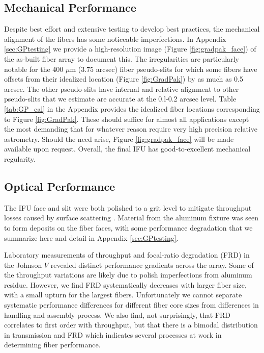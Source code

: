 \subsection{Mechanical Performance}

Despite best effort and extensive testing to develop best practices,
the mechanical alignment of the \GP fibers has some noticeable
imperfections. In Appendix \ref{sec:GPtesting} we provide a
high-resolution image (Figure \ref{fig:gradpak_face}) of the as-built
fiber array to document this. The irregularities are particularly
notable for the 400 $\mu$m (3.75 arcsec) fiber pseudo-slits for which
some fibers have offsets from their idealized location (Figure
\ref{fig:GradPak}) by as much as 0.5 arcsec. The other pseudo-slits
have internal and relative alignment to other pseudo-slits that we
estimate are accurate at the 0.l-0.2 arcsec level. Table
\ref{tab:GP_cal} in the Appendix provides the
idealized fiber locations corresponding to Figure
\ref{fig:GradPak}. These should suffice for almost all applications
except the most demanding that for whatever reason require very high
precision relative astrometry. Should the need arise, Figure
\ref{fig:gradpak_face} will be made available upon request. Overall,
the final IFU has good-to-excellent mechanical regularity.

\subsection{Optical Performance}

\label{sec:gradpak_performance}

The IFU face and slit were both polished to a  grit
level to mitigate throughput losses caused by surface scattering
\citep{Eigenbrot12}. Material from the aluminum fixture was seen to
form deposits on the fiber faces, with some performance degradation
that we summarize here and detail in Appendix \ref{sec:GPtesting}.

Laboratory measurements of throughput and focal-ratio degradation
(FRD) in the Johnson $V$ revealed distinct performance gradients
across the array. Some of the throughput variations are likely due to
polish imperfections from aluminum residue. However, we find FRD
systematically decreases with larger fiber size, with a small upturn
for the largest fibers. Unfortunately we cannot separate systematic
performance differences for different fiber core sizes from
differences in handling and assembly process. We also find, not
surprisingly, that FRD correlates to first order with throughput, but
that there is a bimodal distribution in transmission and FRD which
indicates several processes at work in determining fiber performance.


